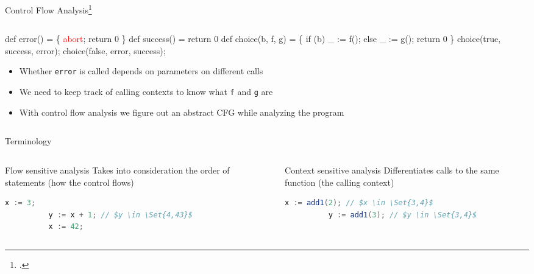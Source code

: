 \begin{frame}[fragile]{Control Flow Analysis\footcite{shivers1991control}}
  \footnotesize
  \begin{columns}
    \begin{column}{0.75\textwidth}
  \begin{semiverbatim}\footnotesize
def error() = \{ \textcolor{red}{abort}; return 0 \}
def success() = return 0
def choice(b, f, g) = \{
  if (b) _ := \alert<4>{f}();
  else   _ := \alert<4>{g}();
  return 0
\}
choice(true, success, error);
choice(false, error, success);
\end{semiverbatim}\vspace{-1em}
\begin{itemize}
\item<4-> Whether \texttt{error} is called depends on parameters on different calls
\item<5-> We need to keep track of calling contexts to know what \texttt{f} and \texttt{g} are
\item<6-> With control flow analysis we figure out an abstract CFG while analyzing the program
\end{itemize}
\end{column}
\begin{column}{0.25\textwidth}
\end{column}
\end{columns}
\end{frame}

\begin{frame}[fragile]{Terminology}
  \begin{columns}[t]
    \begin{column}{.45\textwidth}
      \begin{block}{Flow sensitive analysis}
        Takes into consideration the order of statements (how the control flows)
      \end{block}
      \begin{example}
        \begin{lstlisting}[language=Java,mathescape]
          x := 3;
          y := x + 1; // $y \in \Set{4,43}$
          x := 42;
        \end{lstlisting}
      \end{example}
    \end{column}
    \begin{column}{.45\textwidth}
      \pause
      \begin{block}{Context sensitive analysis}
        Differentiates calls to the same function (the calling context)
      \end{block}
      \begin{example}
        \begin{lstlisting}[language=Java,mathescape]
          x := add1(2); // $x \in \Set{3,4}$
          y := add1(3); // $y \in \Set{3,4}$
        \end{lstlisting}
      \end{example}
    \end{column}
  \end{columns}
\end{frame}
        
